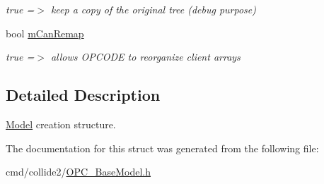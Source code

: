\begin{DoxyCompactItemize}
\begin{DoxyCompactList}\small\item\em true =$>$ keep a copy of the original tree (debug purpose) \end{DoxyCompactList}\item 
bool \hyperlink{structOPCODECREATE_a4953a7541a5efbb8a07f70fa158ae400}{m\+Can\+Remap}\hypertarget{structOPCODECREATE_a4953a7541a5efbb8a07f70fa158ae400}{}\label{structOPCODECREATE_a4953a7541a5efbb8a07f70fa158ae400}

\begin{DoxyCompactList}\small\item\em true =$>$ allows O\+P\+C\+O\+DE to reorganize client arrays \end{DoxyCompactList}\end{DoxyCompactItemize}


\subsection{Detailed Description}
\hyperlink{classModel}{Model} creation structure. 

The documentation for this struct was generated from the following file\+:\begin{DoxyCompactItemize}
\item 
cmd/collide2/\hyperlink{OPC__BaseModel_8h}{O\+P\+C\+\_\+\+Base\+Model.\+h}\end{DoxyCompactItemize}
